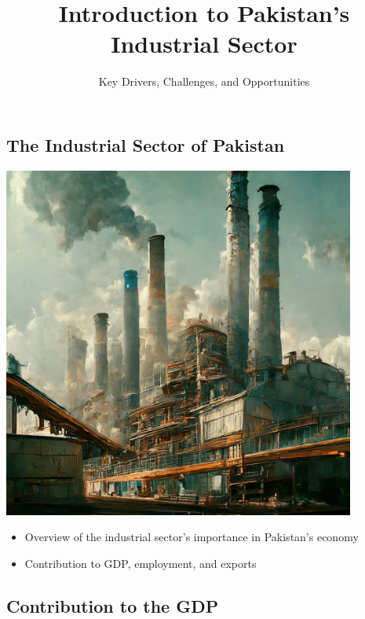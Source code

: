 \documentclass[
  letterpaper,
  DIV=11,
  numbers=noendperiod]{scrartcl}
\title{Introduction to Pakistan's Industrial Sector}
\subtitle{Key Drivers, Challenges, and Opportunities}
\author{}
\date{}
\begin{document}
\maketitle

\subsection{The Industrial Sector of
Pakistan}\label{the-industrial-sector-of-pakistan}

\includegraphics[width=4.5625in,height=\textheight]{images/industrial.jpeg}

\begin{itemize}
\item
  Overview of the industrial sector's importance in Pakistan's economy
\item
  Contribution to GDP, employment, and exports
\end{itemize}

\subsection{Contribution to the GDP}\label{contribution-to-the-gdp}
\end{document}
